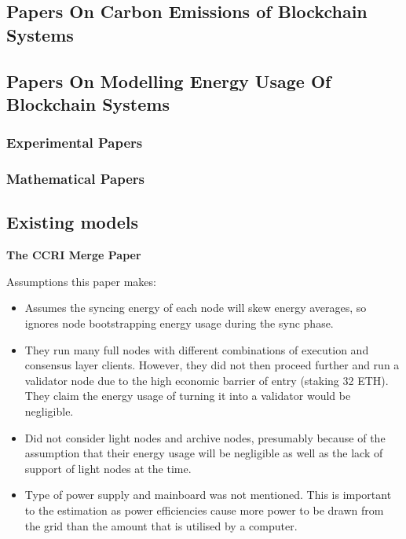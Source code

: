
\subsection{Papers On Carbon Emissions of Blockchain Systems}



\subsection{Papers On Modelling Energy Usage Of Blockchain Systems}



\subsubsection{Experimental Papers}




\subsubsection{Mathematical Papers}



\subsection{ Existing models }
\label{LitRevExistingModels}
\textbf{The CCRI Merge Paper } \cite{CryptoCarbonRatingsInstitute2022TheNetwork}

Assumptions this paper makes:
\begin{itemize}
    \item Assumes the syncing energy of each node will skew energy averages, so ignores node bootstrapping energy usage during the sync phase.
    
    \item They run many full nodes with different combinations of execution and consensus layer clients. However, they did not then proceed further and run a validator node due to the high economic barrier of entry (staking 32 ETH). They claim the energy usage of turning it into a validator would be negligible.
    
    \item Did not consider light nodes and archive nodes, presumably because of the assumption that their energy usage will be negligible as well as the lack of support of light nodes at the time.

    \item Type of power supply and mainboard was not mentioned. This is important to the estimation as power efficiencies cause more power to be drawn from the grid than the amount that is utilised by a computer.
\end{itemize}

